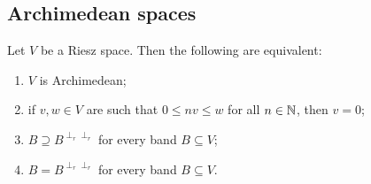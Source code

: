 \subsection{Archimedean spaces}

\begin{proposition} \label{ArchimedeanBandEquivalents}
Let $V$ be a Riesz space. Then the following are equivalent:
\begin{enumerate}
\item $V$ is Archimedean;
\item if $v,w\in V$ are such that $0\leq nv\leq w$ for all $n\in \mathbb{N}$, then $v = 0$;
\item $B \supseteq B^{\perp_r\perp_r}$ for every band $B\subseteq V$;
\item $B = B^{\perp_r\perp_r}$ for every band $B\subseteq V$.
\end{enumerate}
\end{proposition}
